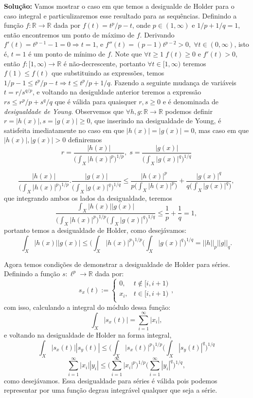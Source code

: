 \documentclass{article}
\begin{document}
\begin{enumerate}
\begin{enumerate}
				\textbf{Solução:} Vamos mostrar o caso em que temos a desigualde de Holder para o caso integral e particulizaremos esse resultado para as sequências. Definindo a função $f:\mathbb{R} \to  \mathbb{R}$ dada por $f(t) = t^{p}/p -t$, onde $p \in (1, \infty)$ e $1/p+1/q=1$, então encontremos um ponto de máximo de $f$. Derivando $f'(t) = t^{p-1} - 1 =0 \Rightarrow t=1$, e $f''(t) = (p-1)t^{p-2} >0, \;\forall t \in (0, \infty)$, isto é, $t=1$ é um ponto de mínimo de $f$. Note que $\forall t \geq 1 \; f(t) \geq 0 $ e $f'(t) >0$, então $f: [1, \infty) \to \mathbb{R}$ é não-decrescente, portanto $\forall t \in [1, \infty)$ teremos $f(1) \leq f(t)$ que substituindo as expressões, temos $1/p - 1\leq  t^{p}/p -t \Rightarrow t \leq t^{p}/p + 1/q$. Fazendo a seguinte mudança de variáveis $t = r/s^{q/p}$, e voltando na desiguldade anterior teremos a expressão $rs \leq r^{p}/p + s^{q}/q$ que é válida para quaisquer $r, s \geq 0$ e é denominada de \textit{desigualdade de Young}. Observemos que $\forall h, g : \mathbb{R} \to \mathbb{R}$ podemos definir $r=|h(x)|, s=|g(x)| \geq 0$, que inserindo na desigualdade de Young, é satisfeita imediatamente no caso em que $|h(x)|=|g(x)| = 0$, mas caso em que $|h(x)|, |g(x)| > 0$ definiremos 
				$$
				r=\frac{|h(x)|}{ \Big (\int_{X}|h(x)|^{p} \Big )^{1/p}}, \; 				s=\frac{|g(x)|}{ \Big (\int_{X}|g(x)|^{q} \Big )^{1/q}}
				$$
				
				$$
				\frac{|h(x)|}{ \Big (\int_{X}|h(x)|^{p} \Big )^{1/p}}. \frac{|g(x)|}{ \Big (\int_{X}|g(x)|^{q} \Big )^{1/q}} \leq \frac{|h(x)|^{p}}{p\Big (\int_{X}|h(x)|^{p} \Big )} + \frac{|g(x)|^{q}}{q\Big (\int_{X}|g(x)|^{q} \Big )},
				$$
				que integrando ambos os lados da desigualdade, teremos
				$$
				\frac{\int_{X}|h(x)||g(x)|}{ \Big (\int_{X}|h(x)|^{p} \Big )^{1/p} \Big (\int_{X}|g(x)|^{q} \Big )^{1/q}} \leq \frac{1}{p} + \frac{1}{q} = 1,
				$$
				portanto temos a desigualdade de Holder, como desejávamos:
				$$
				\int_{X}|h(x)||g(x)|\leq \Big (\int_{X}|h(x)|^{p} \Big )^{1/p}\Big (\int_{X}|g(x)|^{q} \Big )^{1/q} = ||h||_{p}||g||_{q}.
				$$
				
				Agora temos condições de demonstrar a desigualdade de Holder para séries. Definindo a função $s: \ell^{p} \to \mathbb{R}$ dada por:
				$$
				s_{x}(t) := \left\{
				\begin{array}{cc}
				0, & t \notin [i, i+1)\\
				x_{i}, & t \in [i, i+1) \\
				\end{array}
				\right.,
				$$
				com isso, calculando a integral do módulo dessa função:
				$$
				\int_{X} |s_{x}(t)| = \sum \limits_{i=1}^{\infty} |x_{i}|,
				$$
				e voltando na desigualdade de Holder na forma integral,
				$$
				\int_{X}|s_{x}(t)||s_{y}(t)| \leq \Big (\int_{X}|s_{x}(t)|^{p} \Big )^{1/p}\Big (\int_{X}|s_{y}(t)|^{q} \Big )^{1/q}
				$$
				$$
				\sum \limits_{i=1}^{\infty} |x_{i}||y_{i}| \leq \Big ( \sum \limits_{i=1}^{\infty} |x_{i}|^{p}\Big)^{1/p} \Big ( \sum \limits_{i=1}^{\infty} |y_{i}|^{q}\Big)^{1/q},
				$$
				como desejávamos. Essa desigualdade para séries é válida pois podemos representar por uma função degrau integrável qualquer que seja a série.
				

\end{enumerate}
\end{enumerate}
\end{document}
